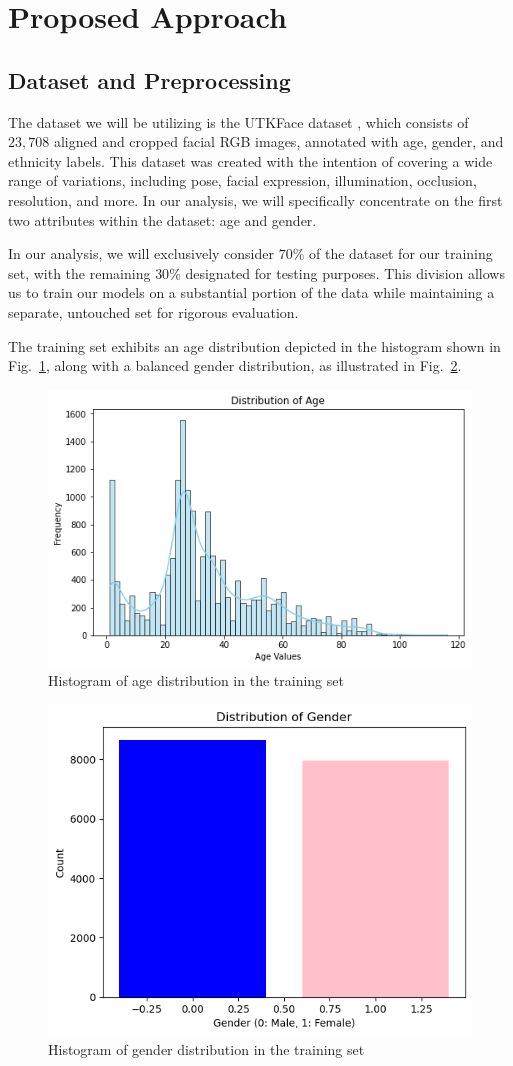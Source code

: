 \section{Proposed Approach} \label{sec:approach}
 
\subsection{Dataset and Preprocessing} \label{sec:dataset}

The dataset we will be utilizing is the UTKFace dataset \cite{app1},
which consists of $23,708$ aligned and cropped facial RGB images, 
annotated with age, gender, and ethnicity labels.
This dataset was created with the intention of covering
a wide range of variations, including pose, facial expression,
illumination, occlusion, resolution, and more.
In our analysis, we will specifically concentrate
on the first two attributes within the dataset: age and gender. 

In our analysis, we will exclusively consider $70\%$
of the dataset for our training set, with the remaining
$30\%$ designated for testing purposes.
This division allows us to train our models on a substantial
portion of the data while maintaining a separate,
untouched set for rigorous evaluation.

The training set exhibits an age distribution depicted
in the histogram
shown in Fig.~\ref{1age}, along with a balanced gender distribution,
as illustrated in Fig.~\ref{2gender1}.

\begin{figure}[htbp]
    \centerline{\includegraphics[width=.5\textwidth]{images/dataset/age.png}}
    \caption{Histogram of age distribution in the training set}
    \label{1age}
\end{figure}

\begin{figure}[htbp]
    \centerline{\includegraphics[width=.4\textwidth]{images/dataset/gender1.png}}
    \caption{Histogram of gender distribution in the training set}
    \label{2gender1}
\end{figure}

